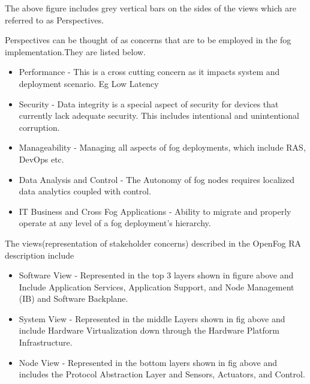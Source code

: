 \documentclass{article}
\begin{document}
The above figure includes grey vertical bars on the sides of the views which are referred to as Perspectives\cite{openfogconsortium2017}.

Perspectives can be thought of as concerns that are to be employed in the fog implementation.They are listed below.

\begin{itemize}
\item Performance - This is a cross cutting concern as it impacts system and deployment scenario. Eg Low Latency

\item Security - Data integrity is a special aspect of security for devices that currently lack adequate security. This includes intentional and unintentional corruption.

\item Manageability - Managing all aspects of fog deployments, which include RAS, DevOps etc. 

\item Data Analysis and Control -  The Autonomy of fog nodes requires localized data analytics coupled with control.

\item IT Business and Cross Fog Applications -  Ability to migrate and properly operate at any level of a fog deployment’s hierarchy.  
\end{itemize}

The views(representation of stakeholder concerns)\cite{openfogconsortium2017} described in the OpenFog RA description include 
\begin{itemize}
\item Software View - Represented in the top 3 layers shown in figure above and Include Application Services, Application Support, and Node Management (IB) and Software Backplane.

\item System View - Represented in the middle Layers shown in fig above and include Hardware Virtualization down through the Hardware Platform Infrastructure.

\item Node View - Represented in the bottom layers shown in fig above and includes the Protocol Abstraction Layer and Sensors, Actuators, and Control.
\end{itemize} 
\end{document}
